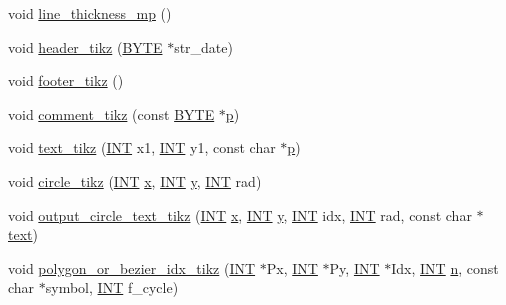 \begin{DoxyCompactItemize}
\item 
void \mbox{\hyperlink{classmp__graphics_ada686670b0e5c358f58c30b554822010}{line\+\_\+thickness\+\_\+mp}} ()
\item 
void \mbox{\hyperlink{classmp__graphics_a89a5fbf0e495443260399c1b6b3bb320}{header\+\_\+tikz}} (\mbox{\hyperlink{galois_8h_ab6cc7b4aeb6ea31aba2b3fbfc83ff5e6}{B\+Y\+TE}} $\ast$str\+\_\+date)
\item 
void \mbox{\hyperlink{classmp__graphics_a6cd32ee52e926c056c84756d5c5a8687}{footer\+\_\+tikz}} ()
\item 
void \mbox{\hyperlink{classmp__graphics_a5ebc960c58934713b1cf4d41561952e2}{comment\+\_\+tikz}} (const \mbox{\hyperlink{galois_8h_ab6cc7b4aeb6ea31aba2b3fbfc83ff5e6}{B\+Y\+TE}} $\ast$\mbox{\hyperlink{alphabet2_8_c_a533391314665d6bf1b5575e9a9cd8552}{p}})
\item 
void \mbox{\hyperlink{classmp__graphics_ac7e4333813701bcc76fc5eba7700bdbd}{text\+\_\+tikz}} (\mbox{\hyperlink{galois_8h_a09fddde158a3a20bd2dcadb609de11dc}{I\+NT}} x1, \mbox{\hyperlink{galois_8h_a09fddde158a3a20bd2dcadb609de11dc}{I\+NT}} y1, const char $\ast$\mbox{\hyperlink{alphabet2_8_c_a533391314665d6bf1b5575e9a9cd8552}{p}})
\item 
void \mbox{\hyperlink{classmp__graphics_a2130247d7df0f51620ccc91d17b713f7}{circle\+\_\+tikz}} (\mbox{\hyperlink{galois_8h_a09fddde158a3a20bd2dcadb609de11dc}{I\+NT}} \mbox{\hyperlink{alphabet2_8_c_a6150e0515f7202e2fb518f7206ed97dc}{x}}, \mbox{\hyperlink{galois_8h_a09fddde158a3a20bd2dcadb609de11dc}{I\+NT}} \mbox{\hyperlink{alphabet2_8_c_a0a2f84ed7838f07779ae24c5a9086d33}{y}}, \mbox{\hyperlink{galois_8h_a09fddde158a3a20bd2dcadb609de11dc}{I\+NT}} rad)
\item 
void \mbox{\hyperlink{classmp__graphics_ac00ec544b0f24fb84caae9f6ef174c84}{output\+\_\+circle\+\_\+text\+\_\+tikz}} (\mbox{\hyperlink{galois_8h_a09fddde158a3a20bd2dcadb609de11dc}{I\+NT}} \mbox{\hyperlink{alphabet2_8_c_a6150e0515f7202e2fb518f7206ed97dc}{x}}, \mbox{\hyperlink{galois_8h_a09fddde158a3a20bd2dcadb609de11dc}{I\+NT}} \mbox{\hyperlink{alphabet2_8_c_a0a2f84ed7838f07779ae24c5a9086d33}{y}}, \mbox{\hyperlink{galois_8h_a09fddde158a3a20bd2dcadb609de11dc}{I\+NT}} idx, \mbox{\hyperlink{galois_8h_a09fddde158a3a20bd2dcadb609de11dc}{I\+NT}} rad, const char $\ast$\mbox{\hyperlink{classmp__graphics_ae92ece77cf1942bfee760d6cf854b74b}{text}})
\item 
void \mbox{\hyperlink{classmp__graphics_ae266ecef91f4cd8a6fd4054b17354370}{polygon\+\_\+or\+\_\+bezier\+\_\+idx\+\_\+tikz}} (\mbox{\hyperlink{galois_8h_a09fddde158a3a20bd2dcadb609de11dc}{I\+NT}} $\ast$Px, \mbox{\hyperlink{galois_8h_a09fddde158a3a20bd2dcadb609de11dc}{I\+NT}} $\ast$Py, \mbox{\hyperlink{galois_8h_a09fddde158a3a20bd2dcadb609de11dc}{I\+NT}} $\ast$Idx, \mbox{\hyperlink{galois_8h_a09fddde158a3a20bd2dcadb609de11dc}{I\+NT}} \mbox{\hyperlink{simeon_8_c_a7f2cd26777ce0ff3fdaf8d02aacbddfb}{n}}, const char $\ast$symbol, \mbox{\hyperlink{galois_8h_a09fddde158a3a20bd2dcadb609de11dc}{I\+NT}} f\+\_\+cycle)

\end{DoxyCompactItemize}
